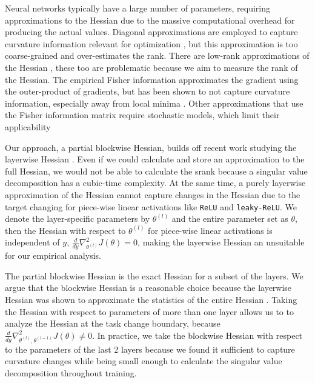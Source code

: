 \documentclass{article}
\begin{document}
Neural networks typically have a large number of parameters, requiring approximations to the Hessian due to the massive computational overhead for producing the actual values.
Diagonal approximations are employed to capture curvature information relevant for optimization \citep{elsayed22_hessc,becker88_improv,lecun89_optim}, but this approximation is too coarse-grained and over-estimates the rank.
There are low-rank approximations of the Hessian \citep{roux07_topmoum}, these too are problematic because we aim to measure the rank of the Hessian.
The empirical Fisher information approximates the gradient using the outer-product of gradients, but has been shown to not capture curvature information, especially away from local minima \citep{kunstner19_limit_fisher}.
Other approximations that use the Fisher information matrix require stochastic models, which limit their applicability \citep{martens2015optimizing}

Our approach, a partial blockwise Hessian, builds off recent work studying the layerwise Hessian \citep{sankar21}.
Even if we could calculate and store an approximation to the full Hessian, we would not be able to calculate the srank because a singular value decomposition has a cubic-time complexity.
At the same time, a purely layerwise approximation of the Hessian cannot capture changes in the Hessian due to the target changing for piece-wise linear activations like \texttt{ReLU} and \texttt{leaky-ReLU}.
We denote the layer-specific parameters by $\theta^{(l)}$ and the entire parameter set as $\theta$, then the Hessian with respect to $\theta^{(l)}$ for piece-wise linear activations is independent of $y$, $\frac{d}{dy}\nabla_{\theta^{(l)}}^{2}J(\theta) = 0$, making the layerwise Hessian an unsuitable for our empirical analysis.

The partial blockwise Hessian is the exact Hessian for a subset of the layers.
We argue that the blockwise Hessian is a reasonable choice because the layerwise Hessian was shown to approximate the statistics of the entire Hessian \citep{wu20_dissec}.
Taking the Hessian with respect to parameters of more than one layer allows us to to analyze the Hessian at the task
change boundary, because
$\frac{d}{dy} \nabla_{\theta^{(l)}, \theta^{(l-1)}}^{2}J(\theta) \not = 0$.
In practice, we take the blockwise Hessian with respect to the parameters of the last 2 layers because we found it sufficient to capture curvature changes while being small enough to calculate the singular value decomposition throughout training.
\end{document}
